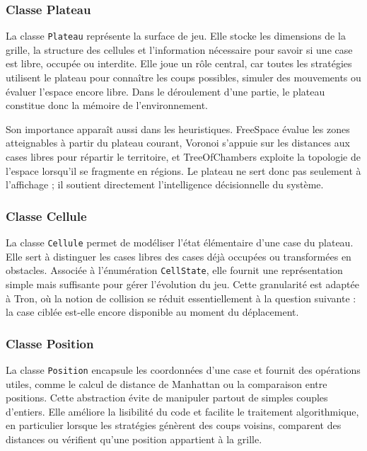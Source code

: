 \documentclass[11pt,a4paper]{article}
\begin{document}
\subsubsection{Classe Plateau}

La classe \texttt{Plateau} représente la surface de jeu. Elle stocke les dimensions de la grille, la structure des cellules et l'information nécessaire pour savoir si une case est libre, occupée ou interdite. Elle joue un rôle central, car toutes les stratégies utilisent le plateau pour connaître les coups possibles, simuler des mouvements ou évaluer l'espace encore libre. Dans le déroulement d'une partie, le plateau constitue donc la mémoire de l'environnement.

Son importance apparaît aussi dans les heuristiques. FreeSpace évalue les zones atteignables à partir du plateau courant, Voronoi s'appuie sur les distances aux cases libres pour répartir le territoire, et TreeOfChambers exploite la topologie de l'espace lorsqu'il se fragmente en régions. Le plateau ne sert donc pas seulement à l'affichage ; il soutient directement l'intelligence décisionnelle du système.

\subsubsection{Classe Cellule}

La classe \texttt{Cellule} permet de modéliser l'état élémentaire d'une case du plateau. Elle sert à distinguer les cases libres des cases déjà occupées ou transformées en obstacles. Associée à l'énumération \texttt{CellState}, elle fournit une représentation simple mais suffisante pour gérer l'évolution du jeu. Cette granularité est adaptée à Tron, où la notion de collision se réduit essentiellement à la question suivante : la case ciblée est-elle encore disponible au moment du déplacement.

\subsubsection{Classe Position}

La classe \texttt{Position} encapsule les coordonnées d'une case et fournit des opérations utiles, comme le calcul de distance de Manhattan ou la comparaison entre positions. Cette abstraction évite de manipuler partout de simples couples d'entiers. Elle améliore la lisibilité du code et facilite le traitement algorithmique, en particulier lorsque les stratégies génèrent des coups voisins, comparent des distances ou vérifient qu'une position appartient à la grille.
\end{document}
